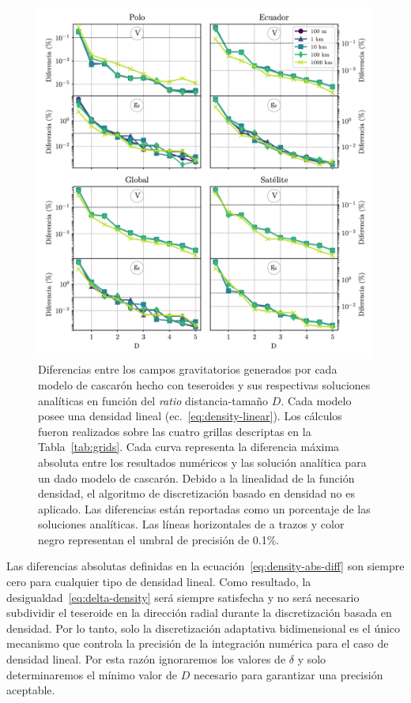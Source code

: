 \begin{figure}
\centering
\includegraphics[width=\linewidth]{figs/tesseroids-variable-density/linear-density-diffs.png}
\caption{
    Diferencias entre los campos gravitatorios generados por cada modelo de
    cascarón hecho con teseroides y sus respectivas soluciones analíticas en
    función del \emph{ratio} distancia-tamaño $D$.
    Cada modelo posee una densidad lineal (ec.~\ref{eq:density-linear}).
    Los cálculos fueron realizados sobre las cuatro grillas descriptas en la
    Tabla~\ref{tab:grids}.
    Cada curva representa la diferencia máxima absoluta entre los resultados
    numéricos y las solución analítica para un dado modelo de cascarón.
    Debido a la linealidad de la función densidad, el algoritmo de
    discretización basado en densidad no es aplicado.
    Las diferencias están reportadas como un porcentaje de las soluciones
    analíticas.
    Las líneas horizontales de a trazos y color negro representan el umbral de
    precisión de 0.1\%.
}
\label{fig:D-linear}
\end{figure}

Las diferencias absolutas definidas en la ecuación~\ref{eq:density-abs-diff}
son siempre cero para cualquier tipo de densidad lineal.
Como resultado, la desigualdad~\ref{eq:delta-density} será siempre satisfecha
y no será necesario subdividir el teseroide en la dirección radial durante la
discretización basada en densidad.
Por lo tanto, solo la discretización adaptativa bidimensional es el único
mecanismo que controla la precisión de la integración numérica para el caso de
densidad lineal.
Por esta razón ignoraremos los valores de $\delta$ y solo determinaremos el
mínimo valor de $D$ necesario para garantizar una precisión aceptable.

